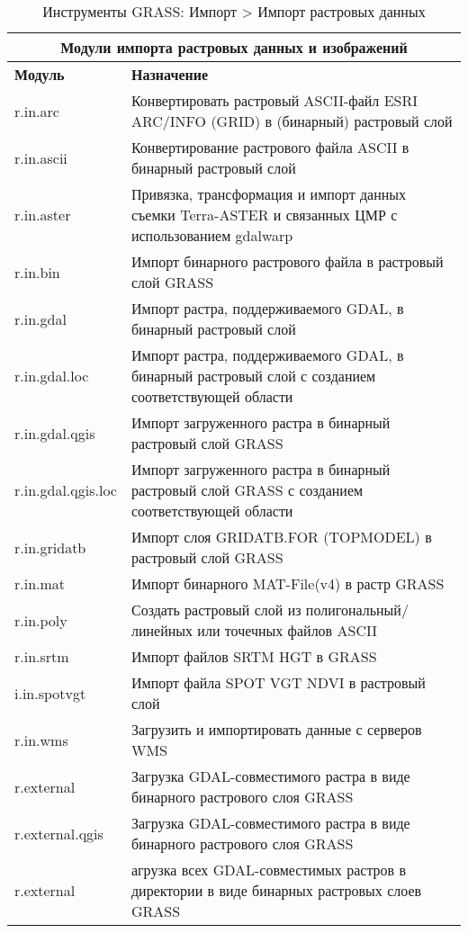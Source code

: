 {\renewcommand{\arraystretch}{0.7}
\begin{table}[H]
\centering
 \begin{tabular}{|p{2.5cm}|p{12.5cm}|}
  \hline \multicolumn{2}{|c|}{\textbf{Модули импорта растровых данных и изображений}} \\
  \hline \textbf{Модуль} & \textbf{Назначение} \\
  \hline r.in.arc & Конвертировать растровый ASCII-файл ESRI ARC/INFO (GRID)
  в (бинарный) растровый слой \\
  \hline r.in.ascii & Конвертирование растрового файла ASCII в бинарный
  растровый слой \\
  \hline r.in.aster & Привязка, трансформация и импорт данных съемки
  Terra-ASTER и связанных ЦМР с использованием gdalwarp \\
  \hline r.in.bin & Импорт бинарного растрового файла в растровый слой
  GRASS \\
  \hline r.in.gdal & Импорт растра, поддерживаемого GDAL, в бинарный
  растровый слой \\
  \hline r.in.gdal.loc & Импорт растра, поддерживаемого GDAL, в бинарный
  растровый слой с созданием соответствующей области \\
  \hline r.in.gdal.qgis & Импорт загруженного растра в бинарный
  растровый слой GRASS \\
  \hline r.in.gdal.qgis.loc & Импорт загруженного растра в бинарный
  растровый слой GRASS с созданием соответствующей области \\
  \hline r.in.gridatb & Импорт слоя GRIDATB.FOR (TOPMODEL) в растровый
  слой GRASS \\
  \hline r.in.mat & Импорт бинарного MAT-File(v4) в растр GRASS \\
  \hline r.in.poly & Создать растровый слой из полигональный/линейных
  или точечных файлов ASCII \\
  \hline r.in.srtm & Импорт файлов SRTM HGT в GRASS \\
  \hline i.in.spotvgt & Импорт файла SPOT VGT NDVI в растровый слой \\
  \hline r.in.wms & Загрузить и импортировать данные с серверов WMS \\
  \hline r.external & Загрузка GDAL-совместимого растра в виде бинарного
  растрового слоя GRASS \\
  \hline r.external.qgis & Загрузка GDAL-совместимого растра в виде бинарного
  растрового слоя GRASS \\
  \hline r.external & агрузка всех GDAL-совместимых растров в директории
  в виде бинарных растровых слоев GRASS \\
  \hline
\end{tabular}
\caption{Инструменты GRASS: Импорт > Импорт растровых данных}
\end{table}}

